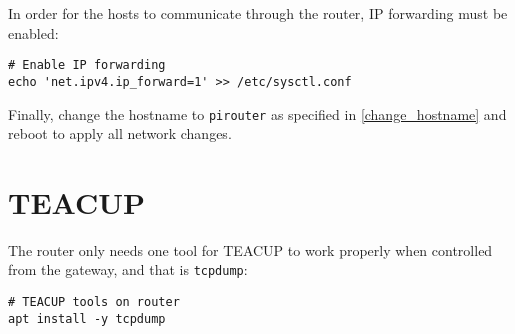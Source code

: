 In order for the hosts to communicate through the router, IP forwarding must be enabled:

\begin{lstlisting}
# Enable IP forwarding
echo 'net.ipv4.ip_forward=1' >> /etc/sysctl.conf
\end{lstlisting}

Finally, change the hostname to \lstinline{pirouter} as specified in \ref{change_hostname} and reboot to apply all network changes.


\section{TEACUP}

The router only needs one tool for TEACUP to work properly when controlled from the gateway, and that is \lstinline{tcpdump}:

\begin{lstlisting}
# TEACUP tools on router
apt install -y tcpdump
\end{lstlisting}